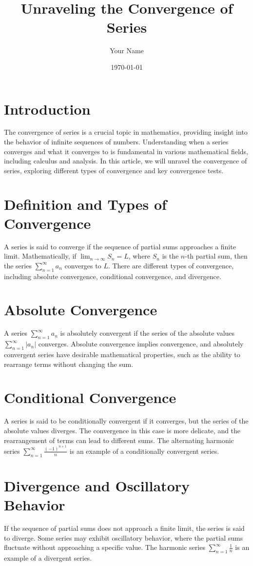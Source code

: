 \documentclass{article}
\title{Unraveling the Convergence of Series}
\author{Your Name}
\date{\today}
\begin{document}
\maketitle

\section*{Introduction}
The convergence of series is a crucial topic in mathematics, providing insight into the behavior of infinite sequences of numbers. Understanding when a series converges and what it converges to is fundamental in various mathematical fields, including calculus and analysis. In this article, we will unravel the convergence of series, exploring different types of convergence and key convergence tests.

\section*{Definition and Types of Convergence}
A series is said to converge if the sequence of partial sums approaches a finite limit. Mathematically, if $\lim_{n\to\infty} S_n = L$, where $S_n$ is the $n$-th partial sum, then the series $\sum_{n=1}^{\infty} a_n$ converges to $L$. There are different types of convergence, including absolute convergence, conditional convergence, and divergence.

\section*{Absolute Convergence}
A series $\sum_{n=1}^{\infty} a_n$ is absolutely convergent if the series of the absolute values $\sum_{n=1}^{\infty} |a_n|$ converges. Absolute convergence implies convergence, and absolutely convergent series have desirable mathematical properties, such as the ability to rearrange terms without changing the sum.

\section*{Conditional Convergence}
A series is said to be conditionally convergent if it converges, but the series of the absolute values diverges. The convergence in this case is more delicate, and the rearrangement of terms can lead to different sums. The alternating harmonic series $\sum_{n=1}^{\infty} \frac{(-1)^{n+1}}{n}$ is an example of a conditionally convergent series.

\section*{Divergence and Oscillatory Behavior}
If the sequence of partial sums does not approach a finite limit, the series is said to diverge. Some series may exhibit oscillatory behavior, where the partial sums fluctuate without approaching a specific value. The harmonic series $\sum_{n=1}^{\infty} \frac{1}{n}$ is an example of a divergent series.
\end{document}
